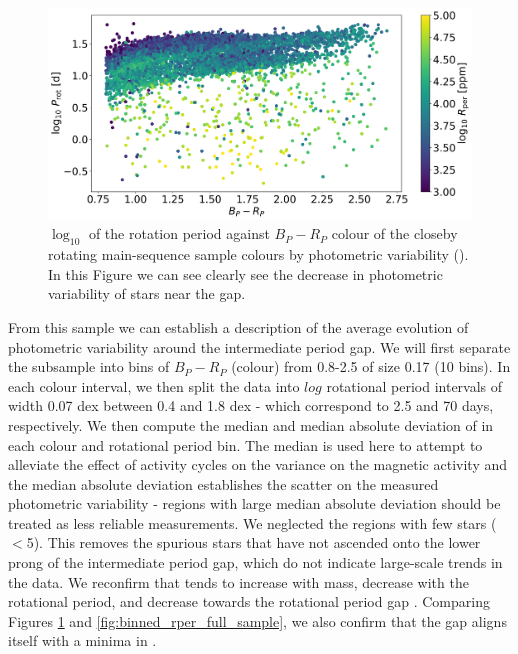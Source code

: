 \begin{figure}
\centering
    \includegraphics[width=\textwidth]{Figures/rot_gap_figures/rotational_dist.png}
    \caption{
    $\log_10$ of the rotation period against \gaia $B_P-R_P$ colour of the closeby rotating main-sequence sample colours by photometric variability (\rper{}). In this Figure we can see clearly see the decrease in photometric variability of stars near the gap.}
    \label{fig:prawn}
\end{figure}

From this sample we can establish a description of the average evolution of photometric variability around the intermediate period gap.
We will first separate the subsample into bins of $B_P - R_P$ (colour) from 0.8-2.5 of size 0.17 (10 bins).
In each colour interval, we then split the data into $log$ rotational period intervals of width 0.07 dex between 0.4 and 1.8 dex - which correspond to 2.5 and 70 days, respectively.
We then compute the median and median absolute deviation of \rper{} in each colour and rotational period bin.
The median is used here to attempt to alleviate the effect of activity cycles on the variance on the magnetic activity and the median absolute deviation establishes the scatter on the measured photometric variability - regions with large median absolute deviation should be treated as less reliable measurements.
We neglected the regions with few stars ($<$5).
This removes the spurious stars that have not ascended onto the lower prong of the intermediate period gap, which do not indicate large-scale trends in the data.
We reconfirm that \rper{} tends to increase with mass, decrease with the rotational period, and decrease towards the rotational period gap \citep{reinhold_stellar_2020,santos_surface_2021}.
Comparing Figures \ref{fig:prawn} and \ref{fig:binned_rper_full_sample}, we also confirm that the gap aligns itself with a minima in \rper{}.

